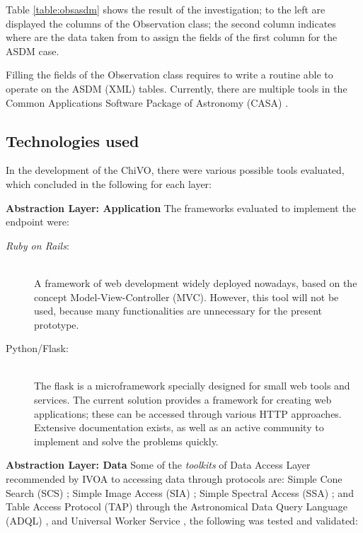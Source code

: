 \documentclass[]{spie}
\newcommand{\ror}{\emph{Ruby on Rails}}
\begin{document}
Table \ref{table:obsasdm} shows the result of the investigation; to the left are displayed the columns of the Observation class; the second column indicates where are the data taken from to assign the fields of the first column for the ASDM case.

Filling the fields of the Observation class requires to write a routine able to operate on the ASDM (XML) tables. Currently, there are multiple tools in the Common Applications Software Package of Astronomy (CASA) \cite{petry2012analysing}.

\subsection{Technologies used}
In the development of the ChiVO, there were various possible tools evaluated, which concluded in the following for each layer:

\textbf{Abstraction Layer:  Application}
The frameworks evaluated to implement the endpoint were: 
\begin{description}
    \item[{\ror}:] \hfill \\
        A framework of web development widely deployed nowadays, based on the concept Model-View-Controller (MVC).  However, this tool will not be used, because many functionalities are unnecessary for the present prototype.
    \item[Python/Flask:] \hfill \\
        The flask is a microframework specially designed for small web tools and services.  The current solution provides a framework for creating web applications; these can be accessed through various HTTP approaches.  Extensive documentation exists, as well as an active community to implement and solve the problems quickly.
\end{description}

\textbf{Abstraction Layer: Data}
Some of the \emph{toolkits} of Data Access Layer recommended by IVOA to accessing data through protocols are:  Simple Cone Search (SCS) \cite{williams2008simple}; Simple Image Access (SIA) \cite{tody2004simple}; Simple Spectral Access (SSA) \cite{tody2008simple}; and Table Access Protocol (TAP) \cite{dowler2010table} through the Astronomical Data Query Language (ADQL) \cite{yasuda2004astronomical}, and Universal Worker Service \cite{rixon2008universal}, the following was tested and validated:
\end{document}
